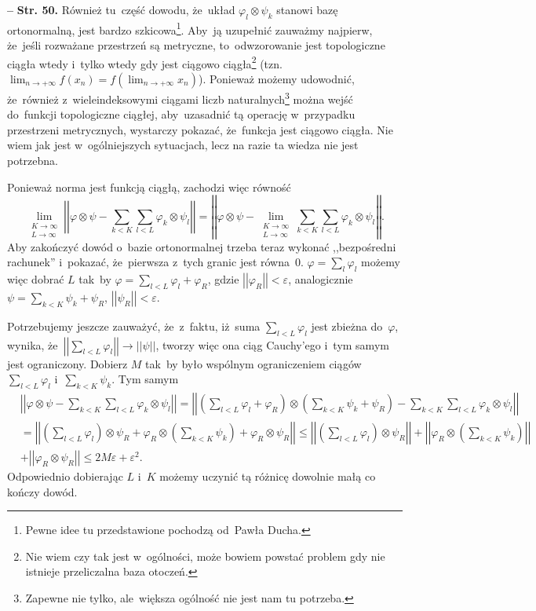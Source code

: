 \documentclass[a4paper,11pt]{article}
\newcommand{\ra}{\rightarrow}
\newcommand{\wtw}{wtedy i~tylko wtedy}
\newcommand{\veps}{\varepsilon}
\newcommand{\vp}{\varphi}
\newcommand{\ot}{\otimes}
\newcommand{\Lim}{\lim\limits}
\newcommand{\Sum}{\sum\limits}
\newcommand{\norm}[1]{\left|\left| #1 \right|\right|}
\newcommand{\tb}{\textbf}
\newcommand{\noi}{\noindent}
\newcommand{\start}{\noi \tb{--} {}}
\newcommand{\Str}[1]{\tb{Str. #1.}}
\begin{document}
\start \Str{50} Również tu~część dowodu, że~układ
$\vp_{ l } \ot \psi_{ k }$ stanowi bazę ortonormalną, jest bardzo
szkicowa\footnote{Pewne idee tu przedstawione pochodzą od~Pawła
  Ducha.}. Aby~ją uzupełnić zauważmy najpierw, że~jeśli rozważane
przestrzeń są metryczne, to~odwzorowanie jest topologiczne
ciągła %
\wtw%
gdy jest ciągowo ciągła\footnote{Nie wiem czy tak jest w~ogólności,
  może bowiem powstać problem gdy nie istnieje przeliczalna baza
  otoczeń.} (tzn.
$\lim_{ n \ra +\infty } f( x_{ n } ) = f( \lim_{ n \ra +\infty } x_{ n
} )$). Ponieważ możemy udowodnić, że~również z~wieleindeksowymi
ciągami liczb naturalnych\footnote{Zapewne nie tylko, ale~większa
  ogólność nie jest nam tu potrzeba.} można wejść do~funkcji
topologiczne ciągłej, aby~uzasadnić tą operację w~przypadku
przestrzeni metrycznych, wystarczy pokazać, że~funkcja jest ciągowo
ciągła. Nie wiem jak jest w~ogólniejszych sytuacjach, lecz na razie ta
wiedza nie jest potrzebna.

Ponieważ norma jest funkcją ciągłą, zachodzi więc równość
\begin{displaymath}
  \Lim_{ \substack{ K \ra \infty \\ L \ra \infty } } \norm{ \vp \ot \psi
    - \Sum_{ k < K }\Sum_{ l < L } \vp_{ k } \ot \psi_{ l } }
  = \norm{ \vp \ot \psi -
    \Lim_{ \substack{ K \ra \infty \\ L \ra \infty } } \Sum_{ k < K }
    \Sum_{ l < L } \vp_{ k } \ot \psi_{ l } }.
\end{displaymath}
Aby zakończyć dowód o~bazie ortonormalnej trzeba teraz wykonać
,,bezpośredni rachunek'' i~pokazać, że~pierwsza z~tych granic jest
równa~0. $\vp = \sum_{ l } \vp_{ l }$ możemy więc dobrać $L$ tak~by
$\vp = \sum_{ l < L } \vp_{ l } + \vp_{ R }$, gdzie
$\norm{ \vp_{ R } } < \veps$, analogicznie
$\psi = \sum_{ k < K } \psi_{ k } + \psi_{ R }$,
$\norm{ \psi_{ R } } < \veps$.

Potrzebujemy jeszcze zauważyć, że~z~faktu, iż~suma
$\sum_{ l < L } \vp_{ l }$ jest zbieżna do~$\vp$, wynika,
że~$\norm{ \sum_{ l < L } \vp_{ l } } \ra \norm{ \psi }$, tworzy więc
ona ciąg Cauchy'ego i~tym samym jest ograniczony.
Dobierz %
$M$ tak~by było wspólnym ograniczeniem ciągów
$\sum_{ l < L } \vp_{ l }$ i~$\sum_{ k < K } \psi_{ k }$. Tym samym
\begin{displaymath}
  \begin{split}
    & \norm{ \vp \ot \psi - \Sum_{ k < K }\Sum_{ l < L } \vp_{ k } \ot
      \psi_{ l } } = \norm{ ( \Sum_{ l < L } \vp_{ l } + \vp_{ R } )
      \ot ( \Sum_{ k < K } \psi_{ k } + \psi_{ R } )
      - \Sum_{ k < K }\Sum_{ l < L } \vp_{ k } \ot \psi_{ l } } \\
    &= \norm{ ( \Sum_{ l < L } \vp_{ l } ) \ot \psi_{ R } + \vp_{ R }
      \ot ( \Sum_{ k < K } \psi_{ k } ) + \vp_{ R } \ot \psi_{ R } }
    \leq \norm{ ( \Sum_{ l < L } \vp_{ l } ) \ot \psi_{ R } }
    + \norm{ \vp_{ R } \ot ( \Sum_{ k < K } \psi_{ k } ) } \\
    &+ \norm{ \vp_{ R } \ot \psi_{ R } } \leq 2 M \veps + \veps^{ 2 }.
  \end{split}
\end{displaymath}
Odpowiednio dobierając $L$ i~$K$ możemy uczynić tą różnicę dowolnie
małą co kończy dowód.
\end{document}
